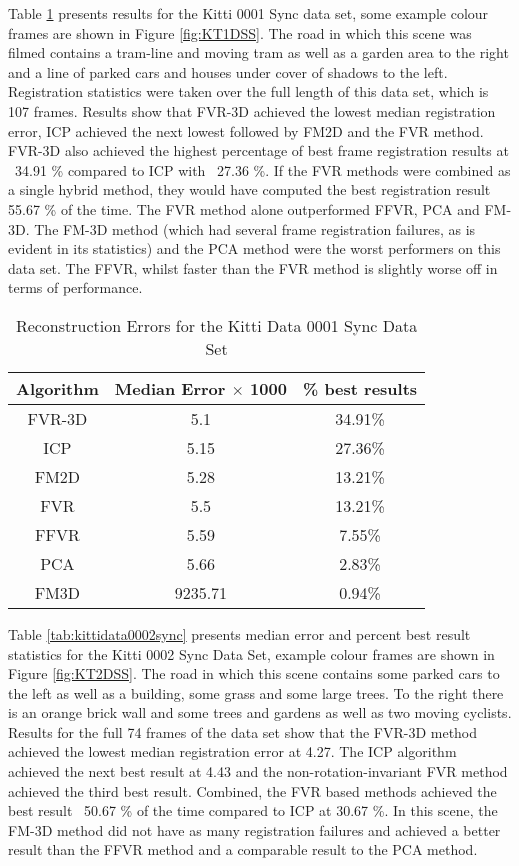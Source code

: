 Table \ref{tab:kittidata0001sync} presents results for the Kitti 0001 Sync data set, some example colour frames are shown in Figure \ref{fig:KT1DSS}. The road in which this scene was filmed contains a tram-line and moving tram as well as a garden area to the right and a line of parked cars and houses under cover of shadows to the left. Registration statistics were taken over the full length of this data set, which is 107 frames. Results show that FVR-3D achieved the lowest median registration error, ICP achieved the next lowest followed by FM2D and the FVR method. FVR-3D also achieved the highest percentage of best frame registration results at ~34.91 \% compared to ICP with ~27.36 \%. If the FVR methods were combined as a single hybrid method, they would have computed the best registration result 55.67 \% of the time. The FVR method alone outperformed FFVR, PCA and FM-3D. The FM-3D method (which had several frame registration failures, as is evident in its statistics) and the PCA method were the worst performers on this data set. The FFVR, whilst faster than the FVR method is slightly worse off in terms of performance. \\ 

\begin{table}[t]
\centering
\caption{Reconstruction Errors for the Kitti Data 0001 Sync Data Set}
\begin{tabular}{ccc}
\hline
\textbf{Algorithm} & \textbf{Median Error $\times$ 1000} & \textbf{\% best results}\\ \hline
FVR-3D	& 5.1 & 34.91\%\\
ICP	& 5.15 & 27.36\%\\
FM2D	& 5.28 & 13.21\%\\
FVR	& 5.5 & 13.21\%\\
FFVR	& 5.59 & 7.55\%\\
PCA	& 5.66 & 2.83\%\\
FM3D	& 9235.71 & 0.94\%\\
\end{tabular}
\label{tab:kittidata0001sync}
\end{table}


Table \ref{tab:kittidata0002sync} presents median error and percent best result statistics for the Kitti 0002 Sync Data Set, example colour frames are shown in Figure \ref{fig:KT2DSS}. The road in which this scene contains some parked cars to the left as well as a building, some grass and some large trees. To the right there is an orange brick wall and some trees and gardens as well as two moving cyclists. Results for the full 74 frames of the data set show that the FVR-3D method achieved the lowest median registration error at 4.27. The ICP algorithm achieved the next best result at 4.43 and the non-rotation-invariant FVR method achieved the third best result. Combined, the FVR based methods achieved the best result ~50.67 \% of the time compared to ICP at 30.67 \%. In this scene, the FM-3D method did not have as many registration failures and achieved a better result than the FFVR method and a comparable result to the PCA method. \\ 

